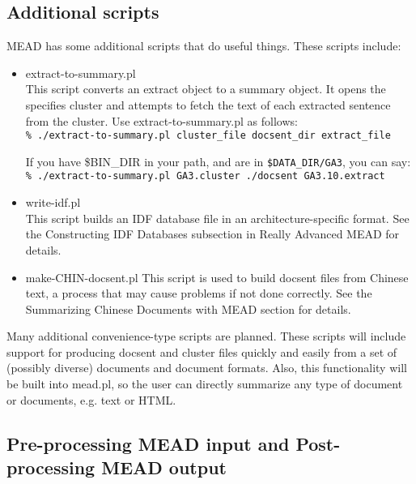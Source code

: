 \documentclass[10pt]{article}
\begin{document}
\subsection{Additional scripts}

MEAD has some additional scripts that do useful things.
These scripts include:

\begin{itemize}
\item extract-to-summary.pl\\
This script converts an extract object to a summary object.
It opens the specifies cluster and attempts to fetch the
text of each extracted sentence from the cluster.  Use 
extract-to-summary.pl as follows:\\

    \verb|% ./extract-to-summary.pl cluster_file docsent_dir extract_file|

\noindent
If you have \$BIN\_DIR in your path, and are in \verb|$DATA_DIR/GA3|, you can say:\\

    \verb|% ./extract-to-summary.pl GA3.cluster ./docsent GA3.10.extract|\\

\item write-idf.pl\\
This script builds an IDF database file in an
architecture-specific format.  See the Constructing IDF Databases
subsection in Really Advanced MEAD for details.

\item make-CHIN-docsent.pl
This script is used to build docsent files from Chinese 
text, a process that may cause problems if not done correctly.
See the Summarizing Chinese Documents with MEAD section for
details.

\end{itemize}

Many additional convenience-type scripts are planned.   These
scripts will include support for producing docsent and cluster
files quickly and easily from a set of (possibly diverse)
documents and document formats.  Also, this functionality will
be built into mead.pl, so the user can directly summarize 
any type of document or documents, e.g. text or HTML.


\subsection{Pre-processing MEAD input and Post-processing MEAD output}
\end{document}
